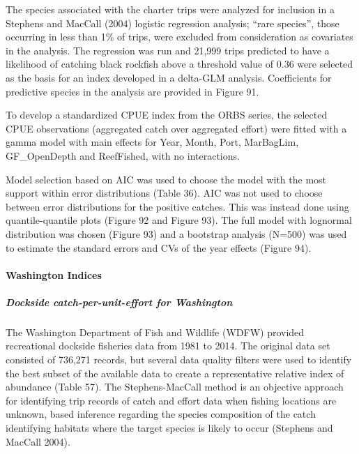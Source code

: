 \documentclass[11pt,
  english,
  letterpaper,
]{article}
\begin{document}
The species associated with the charter trips were analyzed for inclusion in a Stephens and MacCall (2004) logistic regression analysis; ``rare species'', those occurring in less than 1\% of trips, were excluded from consideration as covariates in the analysis. The regression was run and 21,999 trips predicted to have a likelihood of catching black rockfish above a threshold value of 0.36 were selected as the basis for an index developed in a delta-GLM analysis. Coefficients for predictive species in the analysis are provided in Figure 91.

To develop a standardized CPUE index from the ORBS series, the selected CPUE observations (aggregated catch over aggregated effort) were fitted with a gamma model with main effects for Year, Month, Port, MarBagLim, GF\_OpenDepth and ReefFished, with no interactions.

Model selection based on AIC was used to choose the model with the most support within error distributions (Table 36). AIC was not used to choose between error distributions for the positive catches. This was instead done using quantile-quantile plots (Figure 92 and Figure 93). The full model with lognormal distribution was chosen (Figure 93) and a bootstrap analysis (N=500) was used to estimate the standard errors and CVs of the year effects (Figure 94).

\hypertarget{washington-indices}{%
\paragraph{Washington Indices}\label{washington-indices}}

\hypertarget{dockside-catch-per-unit-effort-for-washington}{%
\subparagraph{Dockside catch-per-unit-effort for Washington}\label{dockside-catch-per-unit-effort-for-washington}}

The Washington Department of Fish and Wildlife (WDFW) provided recreational dockside fisheries data from 1981 to 2014. The original data set consisted of 736,271 records, but several data quality filters were used to identify the best subset of the available data to create a representative relative index of abundance (Table 57). The Stephens-MacCall method is an objective approach for identifying trip records of catch and effort data when fishing locations are unknown, based inference regarding the species composition of the catch identifying habitats where the target species is likely to occur (Stephens and MacCall 2004).
\end{document}
